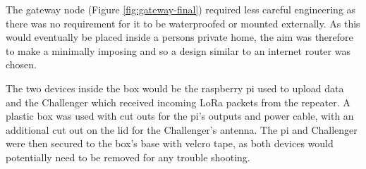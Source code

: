 The gateway node (Figure \ref{fig:gateway-final}) required less careful
engineering as there was no requirement for it to be waterproofed or mounted
externally. As this would eventually be placed inside a persons private home,
the aim was therefore to make a minimally imposing and so a design similar to an
internet router was chosen.

The two devices inside the box would be the raspberry pi used to upload data and
the Challenger which received incoming LoRa packets from the repeater. A plastic
box was used with cut outs for the pi's outputs and power cable, with an
additional cut out on the lid for the Challenger's antenna. The pi and
Challenger were then secured to the box's base with velcro tape, as both devices
would potentially need to be removed for any trouble shooting.